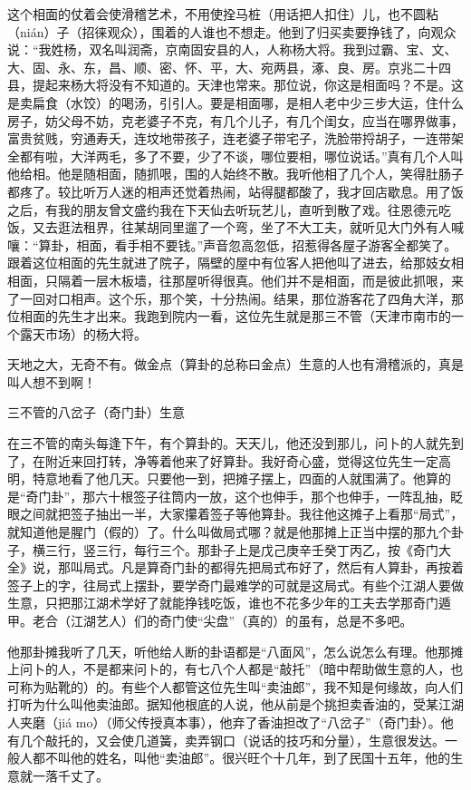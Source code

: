 \documentclass[12pt,UTF8]{ctexbook}
\begin{document}
这个相面的仗着会使滑稽艺术，不用使拴马桩（用话把人扣住）儿，也不圆粘（nián）子（招徕观众），围着的人谁也不想走。他到了归买卖要挣钱了，向观众说：“我姓杨，双名叫润斋，京南固安县的人，人称杨大将。我到过霸、宝、文、大、固、永、东，昌、顺、密、怀、平，大、宛两县，涿、良、房。京兆二十四县，提起来杨大将没有不知道的。天津也常来。那位说，你这是相面吗？不是。这是卖扁食（水饺）的喝汤，引引人。要是相面哪，是相人老中少三步大运，住什么房子，妨父母不妨，克老婆子不克，有几个儿子，有几个闺女，应当在哪界做事，富贵贫贱，穷通寿夭，连坟地带孩子，连老婆子带宅子，洗脸带捋胡子，一连带架全都有啦，大洋两毛，多了不要，少了不谈，哪位要相，哪位说话。”真有几个人叫他给相。他是随相面，随抓哏，围的人始终不散。我听他相了几个人，笑得肚肠子都疼了。较比听万人迷的相声还觉着热闹，站得腿都酸了，我才回店歇息。用了饭之后，有我的朋友曾文盛约我在下天仙去听玩艺儿，直听到散了戏。往恩德元吃饭，又去逛法租界，往某胡同里遛了一个弯，坐了不大工夫，就听见大门外有人喊嚷：“算卦，相面，看手相不要钱。”声音忽高忽低，招惹得各屋子游客全都笑了。跟着这位相面的先生就进了院子，隔壁的屋中有位客人把他叫了进去，给那妓女相相面，只隔着一层木板墙，往那屋听得很真。他们并不是相面，而是彼此抓哏，来了一回对口相声。这个乐，那个笑，十分热闹。结果，那位游客花了四角大洋，那位相面的先生才出来。我跑到院内一看，这位先生就是那三不管（天津市南市的一个露天市场）的杨大将。

天地之大，无奇不有。做金点（算卦的总称曰金点）生意的人也有滑稽派的，真是叫人想不到啊！





三不管的八岔子（奇门卦）生意


在三不管的南头每逢下午，有个算卦的。天天儿，他还没到那儿，问卜的人就先到了，在附近来回打转，净等着他来了好算卦。我好奇心盛，觉得这位先生一定高明，特意地看了他几天。只要他一到，把摊子摆上，四面的人就围满了。他算的是“奇门卦”，那六十根签子往筒内一放，这个也伸手，那个也伸手，一阵乱抽，眨眼之间就把签子抽出一半，大家攥着签子等他算卦。我往他这摊子上看那“局式”，就知道他是腥门（假的）了。什么叫做局式哪？就是他那摊上正当中摆的那九个卦子，横三行，竖三行，每行三个。那卦子上是戊己庚辛壬癸丁丙乙，按《奇门大全》说，那叫局式。凡是算奇门卦的都得先把局式布好了，然后有人算卦，再按着签子上的字，往局式上摆卦，要学奇门最难学的可就是这局式。有些个江湖人要做生意，只把那江湖术学好了就能挣钱吃饭，谁也不花多少年的工夫去学那奇门遁甲。老合（江湖艺人）们的奇门使“尖盘”（真的）的虽有，总是不多吧。

他那卦摊我听了几天，听他给人断的卦语都是“八面风”，怎么说怎么有理。他那摊上问卜的人，不是都来问卜的，有七八个人都是“敲托”（暗中帮助做生意的人，也可称为贴靴的）的。有些个人都管这位先生叫“卖油郎”，我不知是何缘故，向人们打听为什么叫他卖油郎。据知他根底的人说，他从前是个挑担卖香油的，受某江湖人夹磨（jiá mo）（师父传授真本事），他弃了香油担改了“八岔子”（奇门卦）。他有几个敲托的，又会使几道簧，卖弄钢口（说话的技巧和分量），生意很发达。一般人都不叫他的姓名，叫他“卖油郎”。很兴旺个十几年，到了民国十五年，他的生意就一落千丈了。
\end{document}
